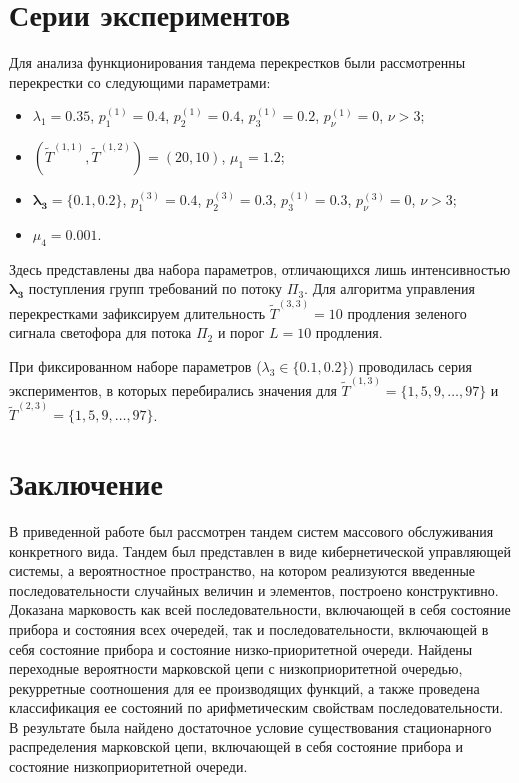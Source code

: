 \documentclass[a4paper,12pt,russian]{extarticle}
\begin{document}
\section{Серии экспериментов}
Для анализа функционирования тандема перекрестков были рассмотренны перекрестки со следующими параметрами:
\begin{itemize}
    \item $\lambda_1=0.35$, $p_{1}^{(1)}=0.4$, $p_{2}^{(1)}=0.4$, $p_{3}^{(1)}=0.2$, $p_{\nu}^{(1)}=0$, $\nu > 3$;
    \item $(\widetilde{T}^{(1,1)}, \widetilde{T}^{(1,2)})=(20,10)$, $\mu_1 = 1.2$;
    \item $\boldsymbol{ \lambda_3=\{0.1, 0.2\}}$, $p_{1}^{(3)}=0.4$, $p_{2}^{(3)}=0.3$, $p_{3}^{(1)}=0.3$, $p_{\nu}^{(3)}=0$, $\nu > 3$;
        \item $\mu_4= 0.001$.
\end{itemize}
Здесь представлены два набора параметров, отличающихся лишь интенсивностью $\boldsymbol{\lambda_3}$ поступления групп требований по потоку $\Pi_3$. Для алгоритма управления перекрестками зафиксируем длительность $\widetilde{T}^{(3,3)}=10$ продления зеленого сигнала светофора для потока $\Pi_2$ и порог $L=10$ продления.

При фиксированном наборе параметров ($\lambda_3 \in \{0.1, 0.2\}$) проводилась серия экспериментов, в которых перебирались значения для $\widetilde{T}^{(1,3)} = \{1, 5, 9, \ldots, 97\}$ и $\widetilde{T}^{(2,3)} = \{1, 5, 9, \ldots, 97\}$.















\section{Заключение}
В приведенной работе был рассмотрен тандем систем массового обслуживания конкретного вида. Тандем был представлен в виде кибернетической управляющей системы, а вероятностное пространство, на котором реализуются введенные последовательности случайных величин и элементов, построено конструктивно. Доказана марковость как всей последовательности, включающей в себя состояние прибора и состояния всех очередей, так и последовательности, включающей в себя состояние прибора и состояние низко-приоритетной очереди. Найдены переходные вероятности марковской цепи с низкоприоритетной очередью, рекурретные соотношения для ее производящих функций, а также проведена классификация ее состояний по арифметическим свойствам последовательности. В результате была найдено достаточное условие существования стационарного распределения марковской цепи, включающей в себя состояние прибора и состояние низкоприоритетной очереди.
\end{document}
